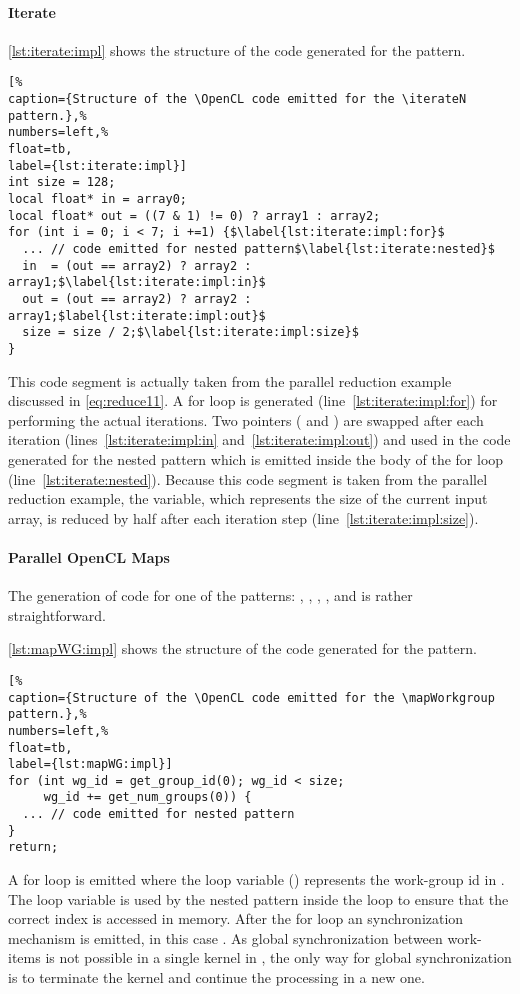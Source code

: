 \paragraph{Iterate}
\autoref{lst:iterate:impl} shows the structure of the \OpenCL code generated for the \iterateN pattern.
%
\begin{lstlisting}[%                                                             
caption={Structure of the \OpenCL code emitted for the \iterateN pattern.},%
numbers=left,%
float=tb,
label={lst:iterate:impl}]
int size = 128;
local float* in = array0;
local float* out = ((7 & 1) != 0) ? array1 : array2;
for (int i = 0; i < 7; i +=1) {$\label{lst:iterate:impl:for}$
  ... // code emitted for nested pattern$\label{lst:iterate:nested}$
  in  = (out == array2) ? array2 : array1;$\label{lst:iterate:impl:in}$
  out = (out == array2) ? array2 : array1;$label{lst:iterate:impl:out}$
  size = size / 2;$\label{lst:iterate:impl:size}$
}
\end{lstlisting}
%
This code segment is actually taken from the parallel reduction example discussed in \autoref{eq:reduce11}.
A for loop is generated (line~\ref{lst:iterate:impl:for}) for performing the actual iterations.
Two pointers ( and ) are swapped after each iteration (lines~\ref{lst:iterate:impl:in} and~\ref{lst:iterate:impl:out}) and used in the code generated for the nested pattern which is emitted inside the body of the for loop (line~\ref{lst:iterate:nested}).
Because this code segment is taken from the parallel reduction example, the  variable, which represents the size of the current input array, is reduced by half after each iteration step (line~\ref{lst:iterate:impl:size}).

\paragraph{Parallel OpenCL Maps}
The generation of \OpenCL code for one of the \map patterns: \mapWorkgroup, \mapLocal, \mapGlobal, \mapWarp, and \mapLane is rather straightforward.

\autoref{lst:mapWG:impl} shows the structure of the \OpenCL code generated for the \mapWorkgroup pattern.
%
\begin{lstlisting}[%                                                             
caption={Structure of the \OpenCL code emitted for the \mapWorkgroup pattern.},%
numbers=left,%
float=tb,
label={lst:mapWG:impl}]
for (int wg_id = get_group_id(0); wg_id < size;
     wg_id += get_num_groups(0)) {
  ... // code emitted for nested pattern
}
return;
\end{lstlisting}
%
A for loop is emitted where the loop variable () represents the work-group id in \OpenCL.
The loop variable is used by the nested pattern inside the loop to ensure that the correct index is accessed in memory.
After the for loop an synchronization mechanism is emitted, in this case .
As global synchronization between work-items is not possible in a single kernel in \OpenCL, the only way for global synchronization is to terminate the \OpenCL kernel and continue the processing in a new one. 


